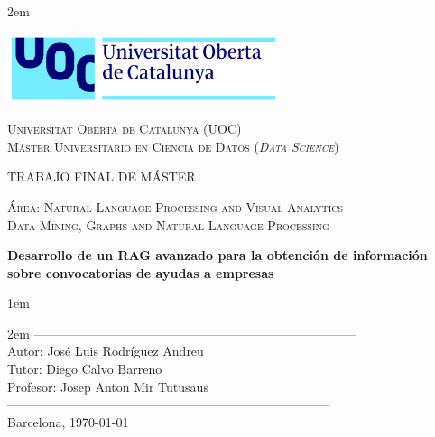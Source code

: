 \newpage
\thispagestyle{empty}

\baselineskip 2em


\centerline{\includegraphics[width=0.6\textwidth]{images/UOC-logo}}
\begin{center}
\textsc{Universitat Oberta de Catalunya (UOC) \\
 Máster Universitario en Ciencia de Datos (\textit{Data Science})\\}


\vspace*{1.5cm}

\textsc{\Large TRABAJO FINAL DE MÁSTER}

\vspace*{0.5cm}

\textsc{\large Área: Natural Language Processing and Visual Analytics\\}
\textsc{\large Data Mining, Graphs and Natural Language Processing}


\vspace*{2.0cm}

\textbf{\Large Desarrollo de un RAG avanzado para la obtención 
de información sobre convocatorias de ayudas a empresas}


\vspace{2.5cm}
\baselineskip 1em

\baselineskip 2em
-----------------------------------------------------------------------------\\
Autor:      José Luis Rodríguez Andreu\\
Tutor:      Diego Calvo Barreno\\
Profesor:   Josep Anton Mir Tutusaus\\
-----------------------------------------------------------------------------\\
\vspace*{1.5cm}
Barcelona, \today

\end{center}

\newpage
\pagestyle{empty}
\hfill
